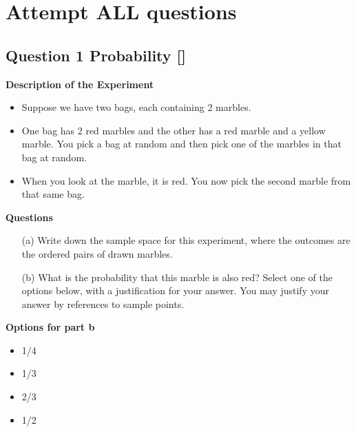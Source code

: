 \documentclass[a4paper,12pt]{article}
\begin{document}
\section*{Attempt ALL questions}

\subsection*{Question 1 Probability []}

\textbf{Description of the Experiment}
\begin{itemize}

\item Suppose we have two bags, each containing 2 marbles. 

\item One bag has 2 red marbles and
the other has a red marble and a yellow marble. 
You pick a bag at random and then pick
one of the marbles in that bag at random. 

\item When you look at the marble, it is red. 
You
now pick the second marble from that same bag.
\end{itemize} 
\textbf{Questions}
\begin{itemize}

\item[(a)]  Write down the sample space for this experiment, where the outcomes are the ordered pairs of drawn marbles.

\item[(b)] What is the probability that this marble
is also red? Select one of the options below, with a justification for your answer.
You may justify your answer by references to sample points.
\end{itemize}
\textbf{Options for part b}
\begin{center}
\begin{multicols}{4}
\begin{itemize}

\item 1/4

\item 1/3

\item 2/3

\item  1/2
\end{itemize}
\end{multicols}
\end{center}
\end{document}
